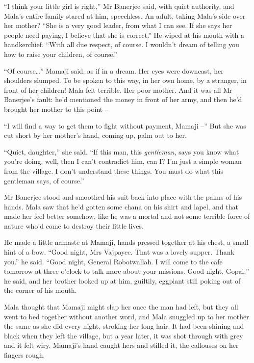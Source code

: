 ``I think your little girl is right,'' Mr Banerjee said, with quiet
authority, and Mala's entire family stared at him, speechless. An
adult, taking Mala's side over her mother? ``She is a very good
leader, from what I can see. If she says her people need paying, I
believe that she is correct.'' He wiped at his mouth with a
handkerchief. ``With all due respect, of course. I wouldn't dream of
telling you how to raise your children, of course.''

``Of course\ldots{}'' Mamaji said, as if in a dream. Her eyes were
downcast, her shoulders slumped. To be spoken to this way, in her
own home, by a stranger, in front of her children! Mala felt
terrible. Her poor mother. And it was all Mr Banerjee's fault: he'd
mentioned the money in front of her army, and then he'd brought her
mother to this point --

``I will find a way to get them to fight without payment, Mamaji --''
But she was cut short by her mother's hand, coming up, palm out to
her.

``Quiet, daughter,'' she said. ``If this man, this \emph{gentleman},
says you know what you're doing, well, then I can't contradict him,
can I? I'm just a simple woman from the village. I don't understand
these things. You must do what this gentleman says, of course.''

Mr Banerjee stood and smoothed his suit back into place with the
palms of his hands. Mala saw that he'd gotten some chana on his
shirt and lapel, and that made her feel better somehow, like he was
a mortal and not some terrible force of nature who'd come to
destroy their little lives.

He made a little namaste at Mamaji, hands pressed together at his
chest, a small hint of a bow. ``Good night, Mrs Vajpayee. That was a
lovely supper. Thank you.'' he said. ``Good night, General
Robotwallah. I will come to the cafe tomorrow at three o'clock to
talk more about your missions. Good night, Gopal,'' he said, and her
brother looked up at him, guiltily, eggplant still poking out of
the corner of his mouth.

Mala thought that Mamaji might slap her once the man had left, but
they all went to bed together without another word, and Mala
snuggled up to her mother the same as she did every night, stroking
her long hair. It had been shining and black when they left the
village, but a year later, it was shot through with grey and it
felt wiry. Mamaji's hand caught hers and stilled it, the callouses
on her fingers rough.

